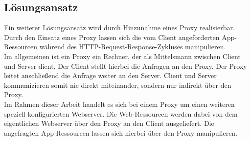 \subsection{Lösungsansatz }
\label{sec:sol_proxy}
Ein weiterer Lösungsansatz wird durch Hinzunahme eines Proxy realisierbar. Durch den Einsatz eines Proxy lassen sich die vom Client angeforderten App-Ressourcen während des HTTP-Request-Response-Zykluses manipulieren.\\
Im allgemeinen ist ein Proxy ein Rechner, der als Mittelsmann zwischen Client und Server dient. Der Client stellt hierbei die Anfragen an den Proxy. Der Proxy leitet anschließend die Anfrage weiter an den Server. Client und Server kommunizieren somit nie direkt miteinander, sondern nur indirekt über den Proxy.\\
Im Rahmen dieser Arbeit handelt es sich bei einem Proxy um einen weiteren speziell konfigurierten Webserver. Die Web-Ressourcen werden dabei von dem eigentlichen Webserver über den Proxy an den Client ausgeliefert. Die angefragten App-Ressourcen lassen sich hierbei über den Proxy manipulieren. 


